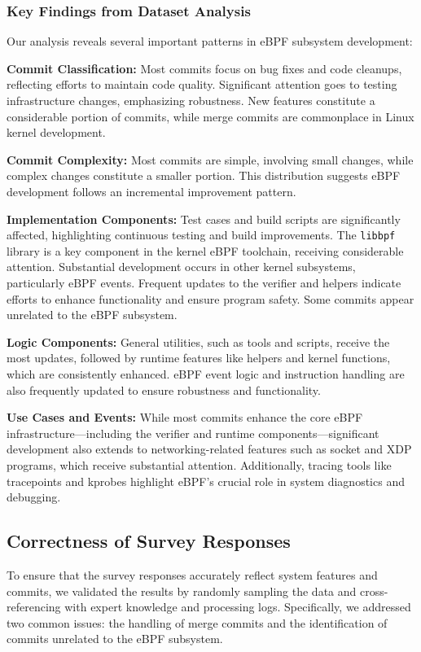 \subsubsection{Key Findings from Dataset Analysis}

Our analysis reveals several important patterns in eBPF subsystem development:

\textbf{Commit Classification:} Most commits focus on bug fixes and code cleanups, reflecting efforts to maintain code quality. Significant attention goes to testing infrastructure changes, emphasizing robustness. New features constitute a considerable portion of commits, while merge commits are commonplace in Linux kernel development.

\textbf{Commit Complexity:} Most commits are simple, involving small changes, while complex changes constitute a smaller portion. This distribution suggests eBPF development follows an incremental improvement pattern.

\textbf{Implementation Components:} Test cases and build scripts are significantly affected, highlighting continuous testing and build improvements. The \texttt{libbpf} library is a key component in the kernel eBPF toolchain, receiving considerable attention. Substantial development occurs in other kernel subsystems, particularly eBPF events. Frequent updates to the verifier and helpers indicate efforts to enhance functionality and ensure program safety. Some commits appear unrelated to the eBPF subsystem.

\textbf{Logic Components:} General utilities, such as tools and scripts, receive the most updates, followed by runtime features like helpers and kernel functions, which are consistently enhanced. eBPF event logic and instruction handling are also frequently updated to ensure robustness and functionality.

\textbf{Use Cases and Events:} While most commits enhance the core eBPF infrastructure—including the verifier and runtime components—significant development also extends to networking-related features such as socket and XDP programs, which receive substantial attention. Additionally, tracing tools like tracepoints and kprobes highlight eBPF's crucial role in system diagnostics and debugging.

\subsection{Correctness of Survey Responses}

To ensure that the survey responses accurately reflect system features and commits, we validated the results by randomly sampling the data and cross-referencing with expert knowledge and processing logs. Specifically, we addressed two common issues: the handling of merge commits and the identification of commits unrelated to the eBPF subsystem.

